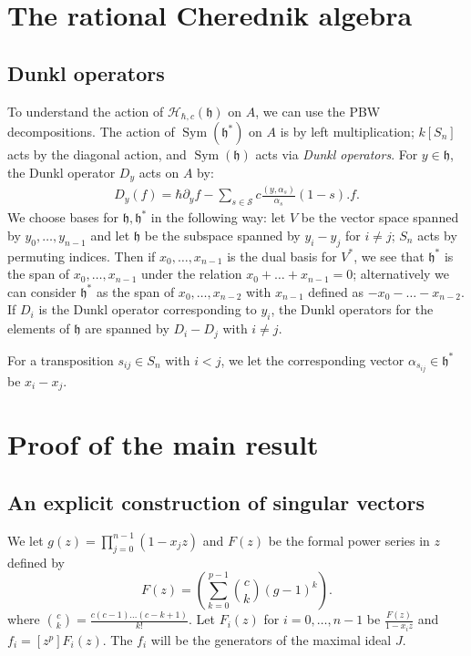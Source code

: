 \documentclass{amsart}
\numberwithin{equation}{section}
\theoremstyle{definition}
\newcommand{\h}{\mathfrak{h}}
\newcommand{\HH}{\mathcal{H}}
\newcommand{\Sym}{\operatorname{Sym}}
\begin{document}

\section{The rational Cherednik algebra}
 
\subsection{Dunkl operators}

To understand the action of $\HH_{\hbar,c}(\h)$ on $A$, we can use the PBW decompositions. The action of $\Sym(\h^*)$ on $A$ is by left multiplication; $k[S_n]$ acts by the diagonal action, and $\Sym(\h)$ acts via {\it Dunkl operators}. For $y \in \h$, the Dunkl operator $D_y$ acts on $A$ by:
\begin{align*}
D_y(f) = \hbar \partial_y f  - \sum_{s \in \mathcal{S}} c \frac{ ( y, \alpha_s )}{\alpha_s} (1-s). f.
\end{align*}
We choose bases for $\h,\h^*$ in the following way: let $V$ be the vector space spanned by $y_0,\dots,y_{n-1}$ and let $\h$ be the subspace spanned by $y_i-y_j$ for $i \ne j$; $S_n$ acts by permuting indices. Then if $x_0,\dots,x_{n-1}$ is the dual basis for $V^*$, we see that $\h^*$ is the span of $x_0,\dots,x_{n-1}$ under the relation $x_0+\dots+x_{n-1}=0$; alternatively we can consider $\h^*$ as the span of $x_0,\dots,x_{n-2}$ with $x_{n-1}$ defined as $-x_0-\dots-x_{n-2}$.  If $D_i$ is the Dunkl operator corresponding to $y_i$, the Dunkl operators for the elements of $\h$ are spanned by $D_i-D_j$ with $i \ne j$. 

For a transposition $s_{ij} \in S_n$ with $i<j$, we let the corresponding vector $\alpha_{s_{ij}} \in \h^*$ be $x_i-x_j$.

\section{Proof of the main result}

\subsection{An explicit construction of singular vectors}

We let $g(z)=\prod_{j=0}^{n-1} (1-x_jz)$ and $F(z)$ be the formal power series in $z$ defined by
\[
F(z) =\left(\sum_{k=0}^{p-1} \binom{c}{k} (g-1)^k\right).
\]
where $\binom{c}{k}=\frac{c(c-1)\dots(c-k+1)}{k!}$. 
Let $F_i(z)$ for $i=0,\dots,n-1$ be $\frac{F(z)}{1-x_iz}$ and $f_i=[z^p]F_i(z)$. The $f_i$ will be the generators of the maximal ideal $J$. 
\end{document}
